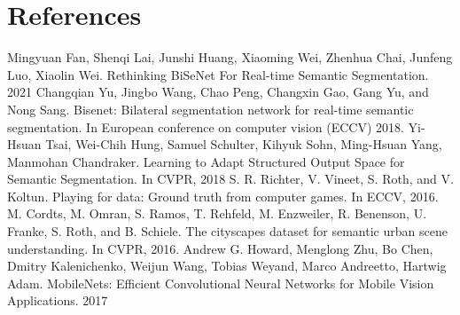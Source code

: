 \documentclass[conference]{IEEEtran}
\begin{document}
\section*{References}

\begin{thebibliography}{00}
 Mingyuan Fan, Shenqi Lai, Junshi Huang, Xiaoming Wei, Zhenhua Chai, Junfeng Luo, Xiaolin Wei. Rethinking BiSeNet For Real-time Semantic Segmentation. 2021
 Changqian Yu, Jingbo Wang, Chao Peng, Changxin Gao, Gang Yu, and Nong Sang. Bisenet: Bilateral segmentation network for real-time semantic segmentation. In European conference on computer vision (ECCV) 2018.
 Yi-Hsuan Tsai, Wei-Chih Hung, Samuel Schulter, Kihyuk Sohn, Ming-Hsuan Yang, Manmohan Chandraker. Learning to Adapt Structured Output Space for Semantic Segmentation. In CVPR, 2018
 S. R. Richter, V. Vineet, S. Roth, and V. Koltun. Playing for data: Ground truth from computer games. In ECCV, 2016.
 M. Cordts, M. Omran, S. Ramos, T. Rehfeld, M. Enzweiler, R. Benenson, U. Franke, S. Roth, and B. Schiele. The cityscapes dataset for semantic urban scene understanding. In CVPR, 2016. 
 Andrew G. Howard, Menglong Zhu, Bo Chen, Dmitry Kalenichenko, Weijun Wang, Tobias Weyand, Marco Andreetto, Hartwig Adam. MobileNets: Efficient Convolutional Neural Networks for Mobile Vision Applications. 2017
\end{thebibliography}
\vspace{12pt}
\end{document}
